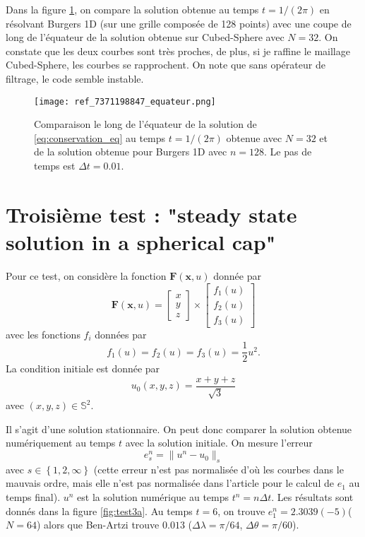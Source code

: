 \documentclass[10pt,a4paper]{article}
\begin{document}
Dans la figure \ref{fig:burgers}, on compare la solution obtenue au temps $t=1/(2 \pi)$ en résolvant Burgers 1D (sur une grille composée de 128 points) avec une coupe de long de l'équateur de la solution obtenue sur Cubed-Sphere avec $N=32$.
On constate que les deux courbes sont très proches, de plus, si je raffine le maillage Cubed-Sphere, les courbes se rapprochent. On note que sans opérateur de filtrage, le code semble instable.

\begin{figure}
\begin{center}
\texttt{[image: ref\_7371198847\_equateur.png]}
\caption{Comparaison le long de l'équateur de la solution de \eqref{eq:conservation_eq} au temps $t=1/(2 \pi)$ obtenue avec $N=32$ et de la solution obtenue pour Burgers 1D avec $n=128$. Le pas de temps est $\Delta t = 0.01$.}
\end{center}
\label{fig:burgers}
\end{figure}

\section{Troisième test : "steady state solution in a spherical cap"}

Pour ce test, on considère la fonction $\mathbf{F}(\mathbf{x},u)$ donnée par
\begin{equation}
\mathbf{F}(\mathbf{x},u) = 
\begin{bmatrix}
x \\ y \\ z 
\end{bmatrix} \times
\begin{bmatrix}
f_1(u) \\ f_2(u) \\ f_3(u) 
\end{bmatrix}
\end{equation}
avec les fonctions $f_i$ données par
\begin{equation}
f_1(u) = f_2(u) = f_3(u) = \dfrac{1}{2}u^2.
\end{equation}
La condition initiale est donnée par
\begin{equation}
u_0(x,y,z) = \dfrac{x+y+z}{\sqrt{3}}
\end{equation}
avec $(x,y,z) \in \mathbb{S}^2$.

Il s'agit d'une solution stationnaire. On peut donc comparer la solution obtenue numériquement au temps $t$ avec la solution initiale. On mesure l'erreur
\begin{equation}
e_s^n = \| u^n - u_0 \|_s
\end{equation}
avec $s \in \left\lbrace 1, 2, \infty \right\rbrace$ (cette erreur n'est pas normalisée d'où les courbes dans le mauvais ordre, mais elle n'est pas normalisée dans l'article pour le calcul de $e_1$ au temps final). $u^n$ est la solution numérique au temps $t^n = n \Delta t$. Les résultats sont donnés dans la figure \ref{fig:test3a}.
Au temps $t=6$, on trouve $e_1^n = 2.3039(-5)$($N=64$) alors que Ben-Artzi trouve $0.013$ ($\Delta \lambda = \pi/64$, $\Delta \theta = \pi/60$).
\end{document}
